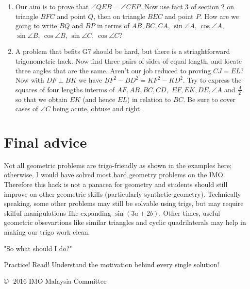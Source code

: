 \documentclass[11pt,a4paper]{article}
\begin{document}
\begin{enumerate}
\item Our aim is to prove that $\angle QEB=\angle CEP$. Now use fact 3 of section 2 on triangle $BFC$ and point $Q$, then on triangle $BEC$ and point $P$. How are we going to write $BQ$ and $BP$ in terms of $AB, BC, CA$, $\sin\angle A$, $\cos\angle A$, $\sin\angle B$, $\cos\angle B$, $\sin\angle C$, $\cos\angle C$?

\item A problem that befits G7 should be hard, but there is a striaghtforward trigonometric hack. Now find three pairs of sides of equal length, and locate three angles that are the same. Aren't our job reduced to proving $CJ=EL$? Now with $DF\perp BK$ we have $BF^{2}-BD^{2}=KF^{2}-KD^{2}$. Try to express the squares of four lengths interms of $AF, AB, BC, CD,$ $EF, EK, DE, \angle A$ and $\frac{A}{2}$ so that we obtain $EK$ (and hence $EL$) in relation to $BC$. Be sure to cover cases of $\angle C$ being acute, obtuse and right.
 
\end{enumerate}

\section {Final advice}

Not all geometric problems are trigo-friendly as shown in the examples here; otherwise, I would have solved most hard geometry problems on the IMO. Therefore this hack is not a panacea for geometry and students should still improve on other geometric skills (particularly synthetic geometry). Technically speaking, some other problems may still be solvable using trigs, but may require skilful manipulations like expanding $\sin (3a+2b)$. Other times, useful geometric obsevartions like similar triangles and cyclic quadrilaterals may help in making our trigo work clean.

"So what should I do?"

Practice! Read! Understand the motivation behind every single solution!

\vspace{5mm} \noindent \copyright \,\, 2016 IMO Malaysia Committee
\end{document}
